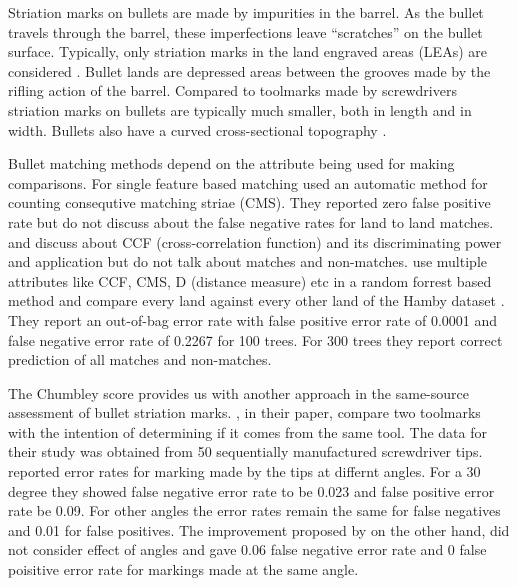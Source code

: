 \documentclass[12pt]{article}
\begin{document}
Striation marks on bullets are made by impurities in the barrel. As the
bullet travels through the barrel, these imperfections leave
``scratches'' on the bullet surface. Typically, only striation marks in
the land engraved areas (LEAs) are considered \citet{afte-article1992}.
Bullet lands are depressed areas between the grooves made by the rifling
action of the barrel. Compared to toolmarks made by screwdrivers
striation marks on bullets are typically much smaller, both in length
and in width. Bullets also have a curved cross-sectional topography
.

Bullet matching methods depend on the attribute being used for making
comparisons. For single feature based matching \citet{chu2013} used an
automatic method for counting consequtive matching striae (CMS). They
reported zero false positive rate but do not discuss about the false
negative rates for land to land matches. \citet{ma2004} and
\citet{vorburger2011} discuss about CCF (cross-correlation function) and
its discriminating power and application but do not talk about matches
and non-matches. \citet{aoas} use multiple attributes like CCF, CMS, D
(distance measure) etc in a random forrest based method and compare
every land against every other land of the Hamby dataset \citet{hamby}.
They report an out-of-bag error rate with false positive error rate of
0.0001 and false negative error rate of 0.2267 for 100 trees. For 300
trees they report correct prediction of all matches and non-matches.

The Chumbley score provides us with another approach in the same-source
assessment of bullet striation marks. \citet{chumbley}, in their paper,
compare two toolmarks with the intention of determining if it comes from
the same tool. The data for their study was obtained from 50
sequentially manufactured screwdriver tips.\citet{chumbley} reported
error rates for marking made by the tips at differnt angles. For a 30
degree they showed false negative error rate to be 0.023 and false
positive error rate be 0.09. For other angles the error rates remain the
same for false negatives and 0.01 for false positives. The improvement
proposed by \citet{hadler} on the other hand, did not consider effect of
angles and gave 0.06 false negative error rate and 0 false poisitive
error rate for markings made at the same angle.
\end{document}
